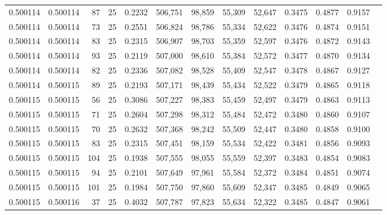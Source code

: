 \begin{tabular}{rrrrrrrrrrrrr}
0.500114 & 0.500114 &    87 &  25 &                                     0.2232 & 506,751 &  98,859 &  55,309 &  52,647 & 0.3475 & 0.4877 & 0.9157 \\
0.500114 & 0.500114 &    73 &  25 &                                     0.2551 & 506,824 &  98,786 &  55,334 &  52,622 & 0.3476 & 0.4874 & 0.9151 \\
0.500114 & 0.500114 &    83 &  25 &                                     0.2315 & 506,907 &  98,703 &  55,359 &  52,597 & 0.3476 & 0.4872 & 0.9143 \\
0.500114 & 0.500114 &    93 &  25 &                                     0.2119 & 507,000 &  98,610 &  55,384 &  52,572 & 0.3477 & 0.4870 & 0.9134 \\
0.500114 & 0.500114 &    82 &  25 &                                     0.2336 & 507,082 &  98,528 &  55,409 &  52,547 & 0.3478 & 0.4867 & 0.9127 \\
0.500114 & 0.500115 &    89 &  25 &                                     0.2193 & 507,171 &  98,439 &  55,434 &  52,522 & 0.3479 & 0.4865 & 0.9118 \\
0.500115 & 0.500115 &    56 &  25 &                                     0.3086 & 507,227 &  98,383 &  55,459 &  52,497 & 0.3479 & 0.4863 & 0.9113 \\
0.500115 & 0.500115 &    71 &  25 &                                     0.2604 & 507,298 &  98,312 &  55,484 &  52,472 & 0.3480 & 0.4860 & 0.9107 \\
0.500115 & 0.500115 &    70 &  25 &                                     0.2632 & 507,368 &  98,242 &  55,509 &  52,447 & 0.3480 & 0.4858 & 0.9100 \\
0.500115 & 0.500115 &    83 &  25 &                                     0.2315 & 507,451 &  98,159 &  55,534 &  52,422 & 0.3481 & 0.4856 & 0.9093 \\
0.500115 & 0.500115 &   104 &  25 &                                     0.1938 & 507,555 &  98,055 &  55,559 &  52,397 & 0.3483 & 0.4854 & 0.9083 \\
0.500115 & 0.500115 &    94 &  25 &                                     0.2101 & 507,649 &  97,961 &  55,584 &  52,372 & 0.3484 & 0.4851 & 0.9074 \\
0.500115 & 0.500115 &   101 &  25 &                                     0.1984 & 507,750 &  97,860 &  55,609 &  52,347 & 0.3485 & 0.4849 & 0.9065 \\
0.500115 & 0.500116 &    37 &  25 &                                     0.4032 & 507,787 &  97,823 &  55,634 &  52,322 & 0.3485 & 0.4847 & 0.9061 \\

\end{tabular}
